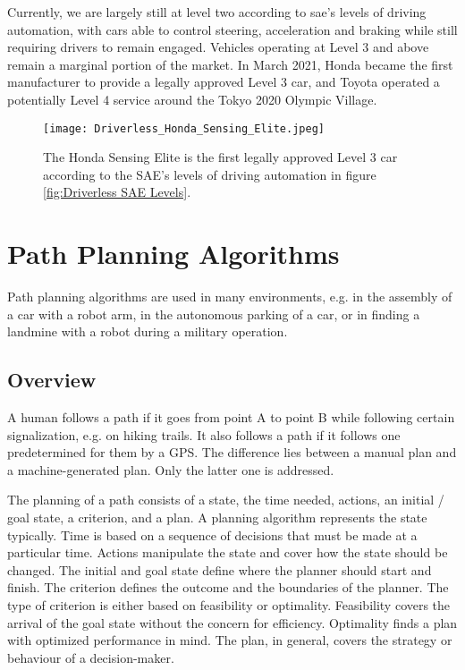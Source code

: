 Currently, we are largely still at level two according to \acrshort{sae}'s levels of driving automation, with cars able to control steering, acceleration and braking while still requiring drivers to remain engaged. Vehicles operating at Level 3 and above remain a marginal portion of the market. \cite{driverless_whats_the_status_of_self_driving_cars}
In March 2021, Honda became the first manufacturer to provide a legally approved Level 3 car, and Toyota operated a potentially Level 4 service around the Tokyo 2020 Olympic Village. \cite{driverless_honda_sensing_elite} \cite{driverless_toyota_olympics}
\begin{figure}[H]
    \centering
    \texttt{[image: Driverless\_Honda\_Sensing\_Elite.jpeg]}
    \caption{The Honda Sensing Elite is the first legally approved Level 3 car according to the SAE's levels of driving automation in figure \ref{fig:Driverless SAE Levels}.}
    \label{fig:Driverless Honda Sensing Elite}
\end{figure}

\pagebreak

\section{Path Planning Algorithms} \label{sec:Path Planning Algorithms}
Path planning algorithms are used in many environments, e.g. in the assembly of a car with a robot arm, in the autonomous parking of a car, or in finding a landmine with a robot during a military operation.

\subsection{Overview} \label{sec:Overview Path Planning Algorithms}
A human follows a path if it goes from point A to point B while following certain signalization, e.g. on hiking trails. It also follows a path if it follows one predetermined for them by a GPS. The difference lies between a manual plan and a machine-generated plan. Only the latter one is addressed.

The planning of a path consists of a state, the time needed, actions, an initial / goal state, a criterion, and a plan. A planning algorithm represents the state typically. Time is based on a sequence of decisions that must be made at a particular time. Actions manipulate the state and cover how the state should be changed. The initial and goal state define where the planner should start and finish.
The criterion defines the outcome and the boundaries of the planner. The type of criterion is either based on feasibility or optimality. Feasibility covers the arrival of the goal state without the concern for efficiency. Optimality finds a plan with optimized performance in mind. The plan, in general, covers the strategy or behaviour of a decision-maker. \cite{planning_algorithms_steven_m_lavalle}

